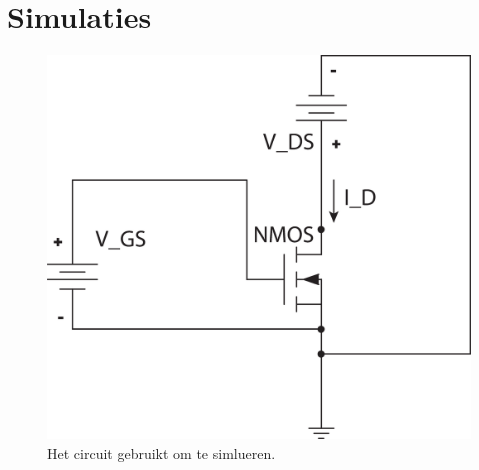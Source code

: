 \documentclass{scrartcl}  %
\begin{document}
\section{Simulaties}
\begin{figure}[H]
\centering
		\includegraphics[width=\textwidth]{resources/NMOS_circuit}
		\caption{Het circuit gebruikt om te simlueren.}
		\label{fig:circuit}
\end{figure}
\end{document}

